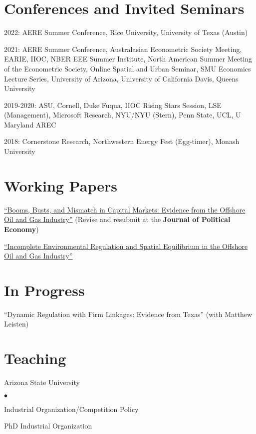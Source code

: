 \documentclass[margin,line]{res}
\newenvironment{list1}{
  \begin{list}{\ding{113}}{%
      \setlength{\itemsep}{.025in}
      \setlength{\parsep}{0in} \setlength{\parskip}{0in}
      \setlength{\topsep}{0in} \setlength{\partopsep}{0in}
      \setlength{\leftmargin}{0.17in}}}{\end{list}}
\newenvironment{list2}{
  \begin{list}{$\bullet$}{%
      \setlength{\itemsep}{0in}
      \setlength{\parsep}{0in} \setlength{\parskip}{0in}
      \setlength{\topsep}{0in} \setlength{\partopsep}{0in}
      \setlength{\leftmargin}{0.2in}}}{\end{list}}
\begin{document}
\begin{resume}
\section{ Conferences and Invited Seminars}
\begin{list1}
\item[] 2022: AERE Summer Conference, Rice University, University of Texas (Austin)
\item[] 2021: AERE Summer Conference, Australasian Econometric Society Meeting, EARIE, IIOC, NBER EEE Summer Institute, North American Summer Meeting of the Econometric Society, Online Spatial and Urban Seminar, SMU Economics Lecture Series, University of Arizona, University of California Davis, Queens University
\item[] 2019-2020: ASU, Cornell, Duke Fuqua, IIOC Rising Stars Session, LSE (Management), Microsoft Research, NYU/NYU (Stern), Penn State, UCL, U Maryland AREC
\item[] 2018:  Cornerstone Research, Northwestern Energy Fest (Egg-timer), Monash University
\end{list1}

\section{Working Papers}
\begin{list1}
\item[] \href{https://nvreug.github.io/paper/bbm.pdf}{``Booms, Busts, and Mismatch in Capital Markets: Evidence from the Offshore Oil and Gas Industry''} (Revise and resubmit at the \textbf{Journal of Political Economy})

\item[] \href{https://nvreug.github.io/paper/oil_incomplete.pdf}{``Incomplete Environmental Regulation and Spatial Equilibrium in the Offshore Oil and Gas Industry''}
\end{list1}

\section{In Progress}
\begin{list1}
	\item[] ``Dynamic Regulation with Firm Linkages: Evidence from Texas'' (with Matthew Leisten)
\end{list1}

\section{Teaching}
\begin{list1}
	\item[] Arizona State University
	\begin{list2}
		\item[] Industrial Organization/Competition Policy 
		\item[] PhD Industrial Organization
	\end{list2}
\end{list1}


\end{resume}
\end{document}
